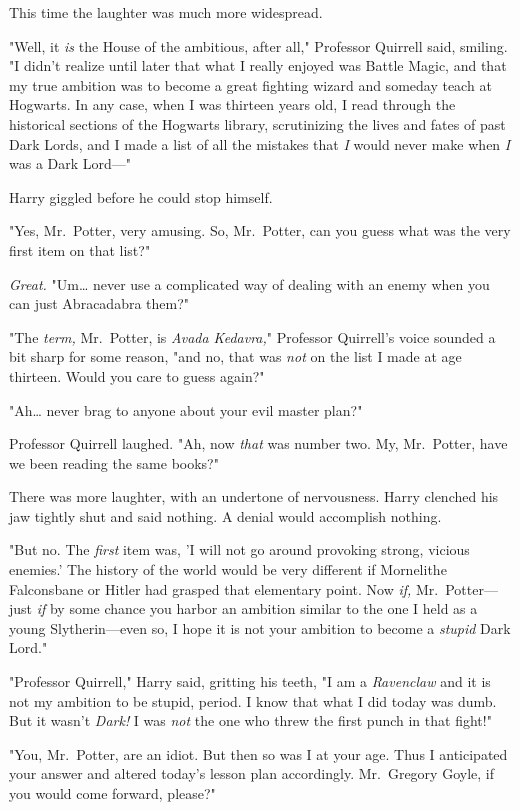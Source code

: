 This time the laughter was much more widespread.

"Well, it \emph{is} the House of the ambitious, after all," Professor Quirrell 
said, smiling. "I didn't realize until later that what I really enjoyed was 
Battle Magic, and that my true ambition was to become a great fighting wizard 
and someday teach at Hogwarts. In any case, when I was thirteen years old, I 
read through the historical sections of the Hogwarts library, scrutinizing the 
lives and fates of past Dark Lords, and I made a list of all the mistakes that 
\emph{I} would never make when \emph{I} was a Dark Lord---"

Harry giggled before he could stop himself.

"Yes, Mr.~Potter, very amusing. So, Mr.~Potter, can you guess what was the very 
first item on that list?"

\emph{Great.} "Um{\ldots} never use a complicated way of dealing with an enemy 
when you can just Abracadabra them?"

"The \emph{term,} Mr.~Potter, is \emph{Avada Kedavra,}" Professor Quirrell's 
voice sounded a bit sharp for some reason, "and no, that was \emph{not} on the 
list I made at age thirteen. Would you care to guess again?"

"Ah{\ldots} never brag to anyone about your evil master plan?"

Professor Quirrell laughed. "Ah, now \emph{that} was number two. My, 
Mr.~Potter, have we been reading the same books?"

There was more laughter, with an undertone of nervousness. Harry clenched his 
jaw tightly shut and said nothing. A denial would accomplish nothing.

"But no. The \emph{first} item was, 'I will not go around provoking strong, 
vicious enemies.' The history of the world would be very different if 
Mornelithe Falconsbane or Hitler had grasped that elementary point. Now 
\emph{if,} Mr.~Potter---just \emph{if} by some chance you harbor an ambition 
similar to the one I held as a young Slytherin---even so, I hope it is not your 
ambition to become a \emph{stupid} Dark Lord."

"Professor Quirrell," Harry said, gritting his teeth, "I am a \emph{Ravenclaw} 
and it is not my ambition to be stupid, period. I know that what I did today 
was dumb. But it wasn't \emph{Dark!} I was \emph{not} the one who threw the 
first punch in that fight!"

"You, Mr.~Potter, are an idiot. But then so was I at your age. Thus I 
anticipated your answer and altered today's lesson plan accordingly. 
Mr.~Gregory Goyle, if you would come forward, please?"

